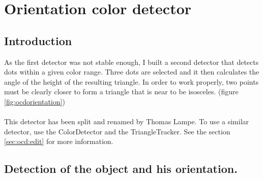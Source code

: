 \section[Orientation color detector (Triangle tracker)]{Orientation color detector}
\label{sec:ocd}

\subsection{Introduction}
\label{sec:ocd:intro}

As the first detector was not stable enough, I built a second detector 
that detects dots within a given color range. Three dots are selected 
and it then calculates the angle of the height of the resulting triangle. 
In order to work properly, two points must be clearly closer to form a 
triangle that is near to be isosceles. (figure \ref{fig:ocdorientation})
\\
\\
This detector has been split and renamed by Thomas Lampe. 
To use a similar detector, 
use the ColorDetector and the 
TriangleTracker. See the section \ref{sec:ocd:edit} for more 
information.

\subsection{Detection of the object and his orientation.}
\label{sec:ocd:detection}


